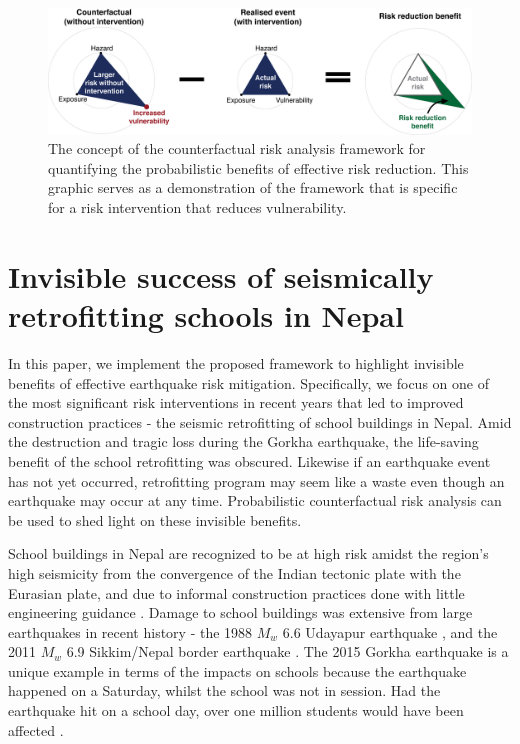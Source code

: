 \begin{figure}[h!] 
\begin{center}
    \includegraphics[width=\textwidth]{Figures/concept-diagram_rev2.png}
    \caption{The concept of the counterfactual risk analysis framework for quantifying the probabilistic benefits of effective risk reduction. This graphic serves as a demonstration of the framework that is specific for a risk intervention that reduces vulnerability.}
    \label{fig:conceptual_diagram}
\end{center}
\end{figure}

\section{Invisible success of seismically retrofitting schools in Nepal}
\label{section-retrofit-program}

In this paper, we implement the proposed framework to highlight invisible benefits of effective earthquake risk mitigation. Specifically, we focus on one of the most significant risk interventions in recent years that led to improved construction practices - the seismic retrofitting of school buildings in Nepal. Amid the destruction and tragic loss during the Gorkha earthquake, the life-saving benefit of the school retrofitting was obscured. Likewise if an earthquake event has not yet occurred, retrofitting program may seem like a waste even though an earthquake may occur at any time. Probabilistic counterfactual risk analysis can be used to shed light on these invisible benefits.

School buildings in Nepal are recognized to be at high risk amidst the region's high seismicity from the convergence of the Indian tectonic plate with the Eurasian plate, and due to informal construction practices done with little engineering guidance \citep{marasini2020}. Damage to school buildings was extensive from large earthquakes in recent history - the 1988 $M_{w}$ 6.6 Udayapur earthquake \citep{gupta1988report}, and the 2011 $M_{w}$ 6.9 Sikkim/Nepal border earthquake \citep{rai2012reconnaissance}. The 2015 Gorkha earthquake is a unique example in terms of the impacts on schools because the earthquake happened on a Saturday, whilst the school was not in session. Had the earthquake hit on a school day, over one million students would have been affected \citep{dixit2014public}.

